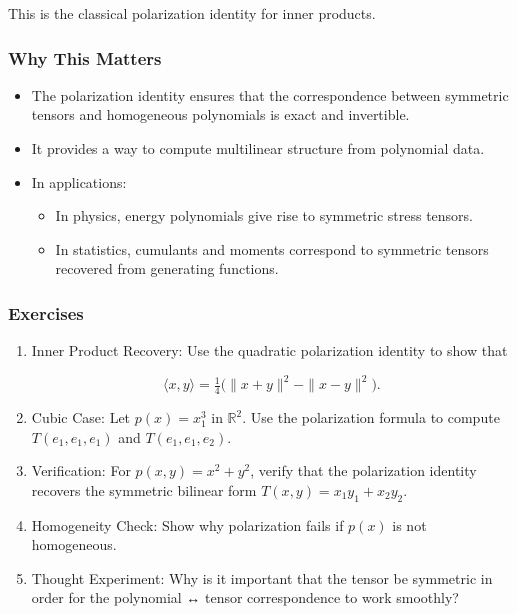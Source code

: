 \documentclass[
  letterpaper,
  DIV=11,
  numbers=noendperiod]{scrreprt}
\providecommand{\tightlist}{%
  \setlength{\itemsep}{0pt}\setlength{\parskip}{0pt}}
\begin{document}
This is the classical polarization identity for inner products.

\subsubsection{Why This Matters}\label{why-this-matters-24}

\begin{itemize}
\item
  The polarization identity ensures that the correspondence between
  symmetric tensors and homogeneous polynomials is exact and invertible.
\item
  It provides a way to compute multilinear structure from polynomial
  data.
\item
  In applications:

  \begin{itemize}
  \tightlist
  \item
    In physics, energy polynomials give rise to symmetric stress
    tensors.
  \item
    In statistics, cumulants and moments correspond to symmetric tensors
    recovered from generating functions.
  \end{itemize}
\end{itemize}

\subsubsection{Exercises}\label{exercises-36}

\begin{enumerate}
\def\labelenumi{\arabic{enumi}.}
\item
  Inner Product Recovery: Use the quadratic polarization identity to
  show that

  \[
  \langle x,y \rangle = \tfrac{1}{4} \big( \|x+y\|^2 - \|x-y\|^2 \big).
  \]
\item
  Cubic Case: Let \(p(x) = x_1^3\) in \(\mathbb{R}^2\). Use the
  polarization formula to compute \(T(e_1,e_1,e_1)\) and
  \(T(e_1,e_1,e_2)\).
\item
  Verification: For \(p(x,y) = x^2 + y^2\), verify that the polarization
  identity recovers the symmetric bilinear form
  \(T(x,y) = x_1y_1 + x_2y_2\).
\item
  Homogeneity Check: Show why polarization fails if \(p(x)\) is not
  homogeneous.
\item
  Thought Experiment: Why is it important that the tensor be symmetric
  in order for the polynomial ↔ tensor correspondence to work smoothly?
\end{enumerate}
\end{document}
